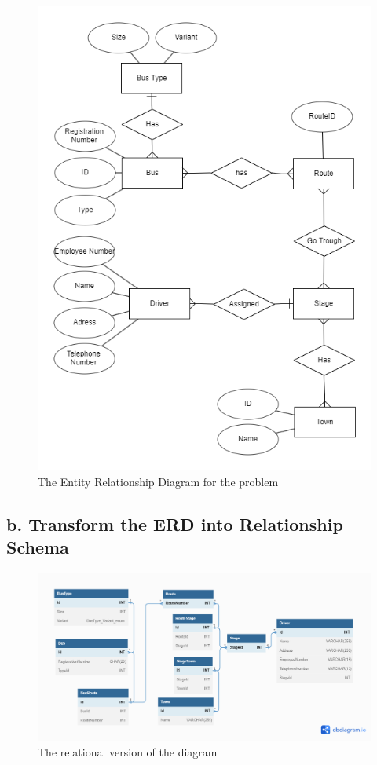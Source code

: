 \documentclass[12pt,titlepage]{article}
\begin{document}
\begin{figure}[H]
    \centering
    \includegraphics[width=.8\textwidth]{images/figures/fig1.png}
    \caption{The Entity Relationship Diagram for the problem}
\end{figure}


\subsection*{b. Transform the ERD into Relationship Schema}

\begin{figure}[H]
    \centering
    \includegraphics[width=\textwidth]{images/figures/fig2.png}
    \caption{The relational version of the diagram}
\end{figure}
\end{document}
